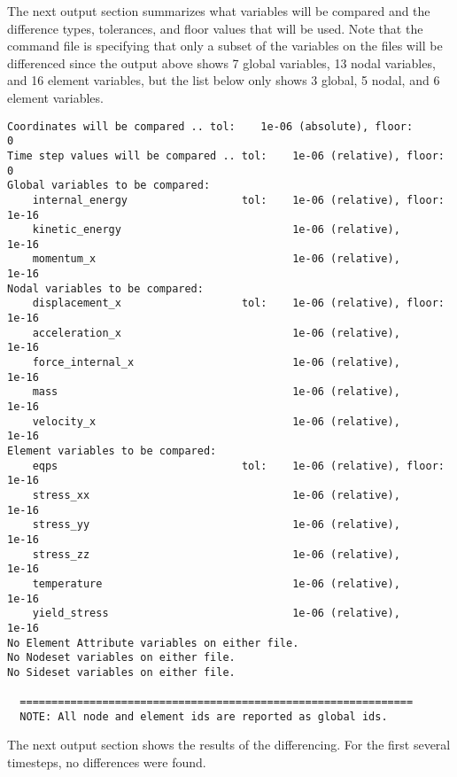 \sectionline
The next output section summarizes what variables will be compared and
the difference types, tolerances, and floor values that will be used.
Note that the command file is specifying that only a subset of the
variables on the files will be differenced since the output above
shows 7 global variables, 13 nodal variables, and 16 element variables,
but the list below only shows 3 global, 5 nodal, and 6 element variables.

\begin{verbatim}
Coordinates will be compared .. tol:    1e-06 (absolute), floor:        0
Time step values will be compared .. tol:    1e-06 (relative), floor:        0
Global variables to be compared:
	internal_energy                  tol:    1e-06 (relative), floor:    1e-16
	kinetic_energy                           1e-06 (relative),           1e-16
	momentum_x                               1e-06 (relative),           1e-16
Nodal variables to be compared:
	displacement_x                   tol:    1e-06 (relative), floor:    1e-16
	acceleration_x                           1e-06 (relative),           1e-16
	force_internal_x                         1e-06 (relative),           1e-16
	mass                                     1e-06 (relative),           1e-16
	velocity_x                               1e-06 (relative),           1e-16
Element variables to be compared:
	eqps                             tol:    1e-06 (relative), floor:    1e-16
	stress_xx                                1e-06 (relative),           1e-16
	stress_yy                                1e-06 (relative),           1e-16
	stress_zz                                1e-06 (relative),           1e-16
	temperature                              1e-06 (relative),           1e-16
	yield_stress                             1e-06 (relative),           1e-16
No Element Attribute variables on either file.
No Nodeset variables on either file.
No Sideset variables on either file.

  ==============================================================
  NOTE: All node and element ids are reported as global ids.
\end{verbatim}

\sectionline
The next output section shows the results of the differencing.  For
the first several timesteps, no differences were found. 

